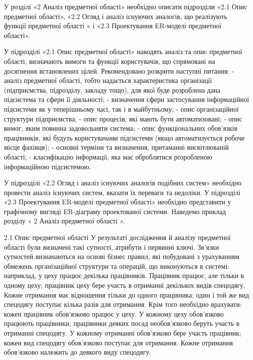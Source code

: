 У розділі «2 Аналіз предметної області» необхідно описати  підрозділи «2.1 Опис предметної області», «2.2 Огляд і аналіз існуючих аналогів, що реалізують функції предметної області » і «2.3 Проектування ER-моделі предметної області».

У підрозділі «2.1 Опис предметної області» наводять аналіз та опис предметної області, визначають вимоги та функції користувачів, що спрямовані на досягнення встановлених цілей.
 Рекомендовано розкрити наступні питання:
- аналіз предметної області, тобто надається характеристика організації (підприємства, підрозділу, закладу тощо), для якої буде розроблена дана підсистема та сфери її діяльності;
- визначення  сфери  застосування  інформаційної  підсистеми  як  у  теперішньому  часі,  так  і  в майбутньому;
- опис організаційної структури підприємства; 
- опис процесів, які мають бути автоматизовані;
- опис вимог, яким повинна задовольняти система;
- опис функціональних обов’язків працівників, які будуть користувачами підсистеми (якщо автоматизується робоче місце фахівця);
- основні терміни та визначення, притаманні висвітлюваній області;
- класифікацію інформації, яка має оброблятися розробленою інформаційною  підсистемою.

	У підрозділі «2.2 Огляд і аналіз існуючих аналогів подібних систем» необхідно провести аналіз існуючих систем, вказати їх переваги та недоліки.
	У підрозділі «2.3 Проектування ER-моделі предметної області» необхідно представити у графічному вигляді ER-діаграму проектованої системи.
	Наведемо приклад розділу « 2 Аналіз предметної області ».

	2.1 Опис предметної області 
	У результаті дослідження й аналізу предметної області були визначені такі сутності, атрибути і первинні ключі. Зв’язки сутностей визначаються на основі бізнес правил, які побудовані з урахуванням обмежень організаційної структури та операцій, що виконуються в системі: наприклад, у цеху працює декілька працівників. Працівник працює, але тільки  в одному цеху; працівник цеху бере участь в отриманні декількох видів спецодягу. Кожне отримання має відношення тільки до одного працівника; один і той же вид спецодягу поступає кілька разів для отримання. Крім того необхідно врахувати: кожен працівник обов’язково працює у цеху. У кожному цеху обов’язково працюють працівники; працівники деяких посад необов’язково беруть участь в отриманні спецодягу. У кожному отриманні обов’язково бере участь працівник; кожен вид спецодягу обов’язково поступає для отримання. Кожне отримання обов’язково належить до деякого виду спецодягу. 
	
